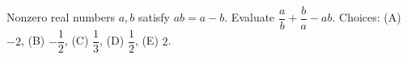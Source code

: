Nonzero real numbers $a,b$ satisfy $ab=a-b$. Evaluate $\dfrac{a}{b}+\dfrac{b}{a}-ab$. Choices: (A) $-2$, (B) $-\dfrac{1}{2}$, (C) $\dfrac{1}{3}$, (D) $\dfrac{1}{2}$, (E) $2$.
